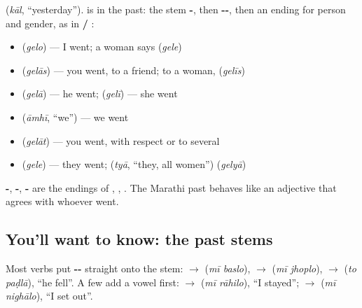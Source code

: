 \textbf{} (\emph{kāl}, \textquotedblleft{}yesterday\textquotedblright{}). \textbf{} is \textbf{} in the past: the stem \textbf{-}, then \textbf{--}, then an ending for person and gender, as in \textbf{ / }:

\begin{itemize}
\raggedright
  \item \textbf{} \textbf{} (\emph{gelo}) — I went; a woman says \textbf{} \textbf{} (\emph{gele})
  \item \textbf{} \textbf{} (\emph{gelās}) — you went, to a friend; to a woman, \textbf{} (\emph{gelīs})
  \item \textbf{} \textbf{} (\emph{gelā}) — he went; \textbf{} \textbf{} (\emph{gelī}) — she went
  \item \textbf{} (\emph{āmhī}, \textquotedblleft{}we\textquotedblright{}) \textbf{} — we went
  \item \textbf{} \textbf{} (\emph{gelāt}) — you went, with respect or to several
  \item \textbf{} \textbf{} (\emph{gele}) — they went; \textbf{} (\emph{tyā}, \textquotedblleft{}they, all women\textquotedblright{}) \textbf{} (\emph{gelyā})
\end{itemize}

\textbf{-}, \textbf{-}, \textbf{-} are the endings of \textbf{}, \textbf{}, \textbf{}. The Marathi past behaves like an adjective that agrees with whoever went.

\subsection*{You'll want to know: the past stems}
Most verbs put \textbf{--} straight onto the stem: \textbf{} $\to$ \textbf{ } (\emph{mī baslo}), \textbf{} $\to$ \textbf{ } (\emph{mī jhoplo}), \textbf{} $\to$ \textbf{ } (\emph{to paḍlā}), \textquotedblleft{}he fell\textquotedblright{}. A few add a vowel first: \textbf{} $\to$ \textbf{ } (\emph{mī rāhilo}), \textquotedblleft{}I stayed\textquotedblright{}; \textbf{} $\to$ \textbf{ } (\emph{mī nighālo}), \textquotedblleft{}I set out\textquotedblright{}.

